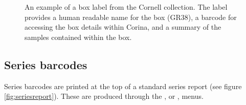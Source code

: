 \begin{figure}[htbp]
  \centering
    \setlength\fboxsep{0pt}
    \setlength\fboxrule{0.5pt}
    \caption{An example of a box label from the Cornell collection. The label provides a human readable name for the box (GR38), a barcode for accessing the box details within Corina, and a summary of the samples contained within the box.}
    \label{fig:boxlabel}
\end{figure}


\subsection{Series barcodes}

Series barcodes are printed at the top of a standard series report (see figure \ref{fig:seriesreport}).  These are produced through the , or , menus.  

